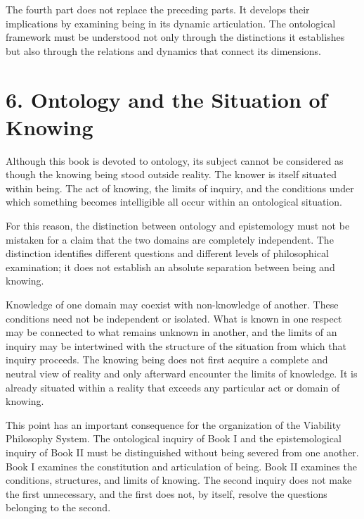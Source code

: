 The fourth part does not replace the preceding parts.
It develops their implications by examining being in
its dynamic articulation. The ontological framework
must be understood not only through the distinctions
it establishes but also through the relations and
dynamics that connect its dimensions.


\section*{6. Ontology and the Situation of Knowing}

Although this book is devoted to ontology, its subject
cannot be considered as though the knowing being stood
outside reality. The knower is itself situated within
being. The act of knowing, the limits of inquiry, and
the conditions under which something becomes intelligible
all occur within an ontological situation.

For this reason, the distinction between ontology and
epistemology must not be mistaken for a claim that the
two domains are completely independent. The distinction
identifies different questions and different levels of
philosophical examination; it does not establish an
absolute separation between being and knowing.

Knowledge of one domain may coexist with non-knowledge
of another. These conditions need not be independent
or isolated. What is known in one respect may be connected
to what remains unknown in another, and the limits of
an inquiry may be intertwined with the structure of
the situation from which that inquiry proceeds. The
knowing being does not first acquire a complete and
neutral view of reality and only afterward encounter
the limits of knowledge. It is already situated within
a reality that exceeds any particular act or domain
of knowing.

This point has an important consequence for the
organization of the Viability Philosophy System.
The ontological inquiry of Book I and the epistemological
inquiry of Book II must be distinguished without being
severed from one another. Book I examines the constitution
and articulation of being. Book II examines the conditions,
structures, and limits of knowing. The second inquiry
does not make the first unnecessary, and the first does
not, by itself, resolve the questions belonging to the
second.


